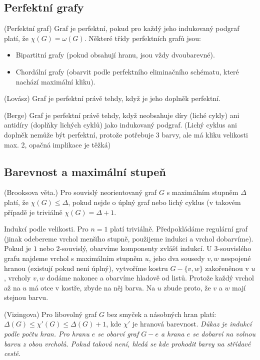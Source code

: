
\subsection{Perfektní grafy}

\df (Perfektní graf) Graf je perfektní, pokud pro každý jeho indukovaný podgraf
platí, že $\chi(G) = \omega(G)$. Některé třídy perfektních grafů jsou:
\begin{itemize}
	\item Bipartitní grafy (pokud obsahují hranu, jsou vždy dvoubarevné).
	\item Chordální grafy (obarvit podle perfektního eliminačního schématu,
		které nachází maximální kliku).
\end{itemize}

\vt (Lovász) Graf je perfektní právě tehdy, když je jeho doplněk perfektní.

\vt (Berge) Graf je perfektní právě tehdy, když neobsahuje díry (liché cykly)
ani antidíry (doplňky lichých cyklů) jako indukovaný podgraf.  (Lichý cyklus ani
doplněk nemůže být perfektní, protože potřebuje 3 barvy, ale má kliku velikosti
max. 2, opačná implikace je těžká)

\subsection{Barevnost a maximální stupeň}

\vt (Brooksova věta.) Pro souvislý neorientovaný graf $G$ s maximálním stupněm
$\Delta$ platí, že $\chi(G) \leq \Delta$, pokud nejde o úplný graf nebo lichý
cyklus (v takovém případě je triviálně $\chi(G) = \Delta+1$.

\dk Indukcí podle velikosti. Pro $n = 1$ platí triviálně.  Předpokládáme
regulární graf (jinak odebereme vrchol menšího stupně, použijeme indukci a
vrchol dobarvíme). Pokud je $1$ nebo $2$-souvislý, obarvíme komponenty zvlášť
indukcí. U 3-souvislého grafu najdeme vrchol s maximálním stupněm $u$, jeho dva
sousedy $v,w$ nespojené hranou (existují pokud není úplný), vytvoříme kostru
$G-\{v,w\}$ zakořeněnou v $u$, vrcholy $v,w$ dodáme nakonec a obarvíme hladově
od listů.  Protože každý vrchol až na $u$ má otce v kostře, zbyde na něj
barva. Na $u$ zbude proto, že $v$ a $w$ mají stejnou barvu.

\vt (Vizingova) Pro libovolný graf $G$ bez smyček a násobných hran platí:
$\Delta(G) \leq \chi'(G) \leq \Delta(G) +1$, kde $\chi'$ je hranová barevnost.
{\it Důkaz je indukcí podle počtu hran. Pro hranu $e$ se obarví graf $G-e$ a
	hrana $e$ se dobarví na volnou barvu z obou vrcholů. Pokud taková není,
hledá se kde prohodit barvy na střídavé cestě.}

